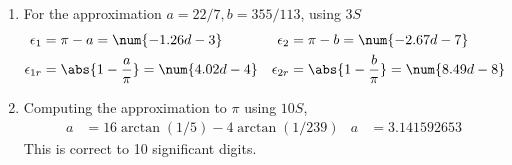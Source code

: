 \begin{enumerate}
    \item For the approximation $ a  = 22/7, b = 355/113 $, using $ 3S $
          \begin{align}
              \epsilon_1    & = \pi - a = \num{-1.26d-3}                &
              \epsilon_2    & = \pi - b = \num{-2.67d-7}                  \\
              \epsilon_{1r} & = \abs{1 - \frac{a}{\pi}} = \num{4.02d-4} &
              \epsilon_{2r} & = \abs{1 - \frac{b}{\pi}} = \num{8.49d-8}
          \end{align}

    \item Computing the approximation to $ \pi $ using $ 10S $,
          \begin{align}
              a & = 16 \arctan(1/5) - 4 \arctan(1/239) &
              a & = 3.141592653
          \end{align}
          This is correct to 10 significant digits.
\end{enumerate}